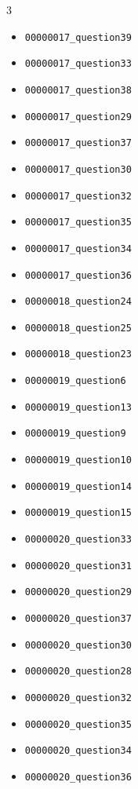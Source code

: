 \begin{multicols}{3}
\begin{itemize}[nosep, leftmargin=*]
        

        \item \texttt{00000017\_question39}
        \item \texttt{00000017\_question33}
        \item \texttt{00000017\_question38}
        \item \texttt{00000017\_question29}
        \item \texttt{00000017\_question37}
        \item \texttt{00000017\_question30}
        \item \texttt{00000017\_question32}
        \item \texttt{00000017\_question35}
        \item \texttt{00000017\_question34}
        \item \texttt{00000017\_question36}
        
        

        \item \texttt{00000018\_question24}
        \item \texttt{00000018\_question25}
        \item \texttt{00000018\_question23}
        
        

        \item \texttt{00000019\_question6}
        \item \texttt{00000019\_question13}
        \item \texttt{00000019\_question9}
        \item \texttt{00000019\_question10}
        \item \texttt{00000019\_question14}
        \item \texttt{00000019\_question15}
        
        

        \item \texttt{00000020\_question33}
        \item \texttt{00000020\_question31}
        \item \texttt{00000020\_question29}
        \item \texttt{00000020\_question37}
        \item \texttt{00000020\_question30}
        \item \texttt{00000020\_question28}
        \item \texttt{00000020\_question32}
        \item \texttt{00000020\_question35}
        \item \texttt{00000020\_question34}
        \item \texttt{00000020\_question36}
        

\end{itemize}
\end{multicols}
